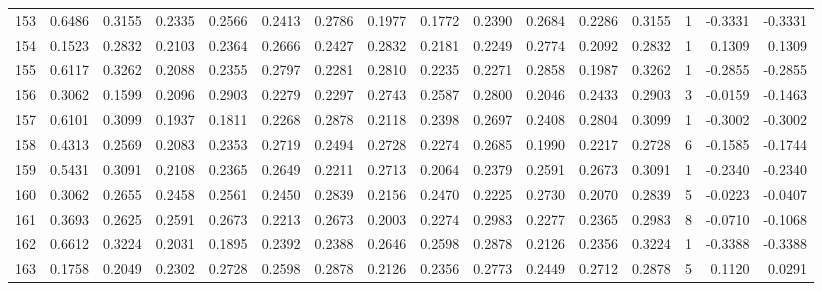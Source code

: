 \begin{tabular}{lrrrrrrrrrrrrrrr}
153 &      0.6486 &  0.3155 &  0.2335 &  0.2566 &  0.2413 &  0.2786 &  0.1977 &  0.1772 &  0.2390 &  0.2684 &   0.2286 &     0.3155 &      1 &                   -0.3331 &                    -0.3331 \\
154 &      0.1523 &  0.2832 &  0.2103 &  0.2364 &  0.2666 &  0.2427 &  0.2832 &  0.2181 &  0.2249 &  0.2774 &   0.2092 &     0.2832 &      1 &                    0.1309 &                     0.1309 \\
155 &      0.6117 &  0.3262 &  0.2088 &  0.2355 &  0.2797 &  0.2281 &  0.2810 &  0.2235 &  0.2271 &  0.2858 &   0.1987 &     0.3262 &      1 &                   -0.2855 &                    -0.2855 \\
156 &      0.3062 &  0.1599 &  0.2096 &  0.2903 &  0.2279 &  0.2297 &  0.2743 &  0.2587 &  0.2800 &  0.2046 &   0.2433 &     0.2903 &      3 &                   -0.0159 &                    -0.1463 \\
157 &      0.6101 &  0.3099 &  0.1937 &  0.1811 &  0.2268 &  0.2878 &  0.2118 &  0.2398 &  0.2697 &  0.2408 &   0.2804 &     0.3099 &      1 &                   -0.3002 &                    -0.3002 \\
158 &      0.4313 &  0.2569 &  0.2083 &  0.2353 &  0.2719 &  0.2494 &  0.2728 &  0.2274 &  0.2685 &  0.1990 &   0.2217 &     0.2728 &      6 &                   -0.1585 &                    -0.1744 \\
159 &      0.5431 &  0.3091 &  0.2108 &  0.2365 &  0.2649 &  0.2211 &  0.2713 &  0.2064 &  0.2379 &  0.2591 &   0.2673 &     0.3091 &      1 &                   -0.2340 &                    -0.2340 \\
160 &      0.3062 &  0.2655 &  0.2458 &  0.2561 &  0.2450 &  0.2839 &  0.2156 &  0.2470 &  0.2225 &  0.2730 &   0.2070 &     0.2839 &      5 &                   -0.0223 &                    -0.0407 \\
161 &      0.3693 &  0.2625 &  0.2591 &  0.2673 &  0.2213 &  0.2673 &  0.2003 &  0.2274 &  0.2983 &  0.2277 &   0.2365 &     0.2983 &      8 &                   -0.0710 &                    -0.1068 \\
162 &      0.6612 &  0.3224 &  0.2031 &  0.1895 &  0.2392 &  0.2388 &  0.2646 &  0.2598 &  0.2878 &  0.2126 &   0.2356 &     0.3224 &      1 &                   -0.3388 &                    -0.3388 \\
163 &      0.1758 &  0.2049 &  0.2302 &  0.2728 &  0.2598 &  0.2878 &  0.2126 &  0.2356 &  0.2773 &  0.2449 &   0.2712 &     0.2878 &      5 &                    0.1120 &                     0.0291 \\

\end{tabular}
